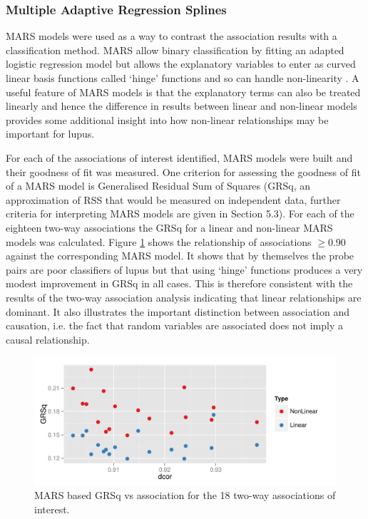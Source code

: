 \documentclass[a4paper, 12pt]{report}
\begin{document}
\subsubsection*{Multiple Adaptive Regression Splines}
MARS models were used as a way to contrast the association results with a classification method. MARS allow binary classification by fitting an adapted logistic regression model but allows the explanatory variables to enter as curved linear basis functions called `hinge' functions and so can handle non-linearity \cite{earth}. A useful feature of MARS models is that the explanatory terms can also be treated linearly and hence the difference in results between linear and non-linear models provides some additional insight into how non-linear relationships may be important for lupus. 

For each of the associations of interest identified, MARS models were built and their goodness of fit was measured. One criterion for assessing the goodness of fit of a MARS model is Generalised Residual Sum of Squares (GRSq, an approximation of RSS that would be measured on independent data, further criteria for interpreting MARS models are given in Section 5.3).  For each of the eighteen two-way associations the GRSq for a linear and non-linear MARS models was calculated. Figure \ref{F:GRSqvAssociation} shows the relationship of associations $\ge 0.90$ against the corresponding MARS model. It shows that by themselves the probe pairs are poor classifiers of lupus but that using `hinge' functions produces a very modest improvement in GRSq in all cases. This is therefore consistent with the results of the two-way association analysis indicating that linear relationships are dominant. It also illustrates the important distinction between association and causation, i.e. the fact that random variables are associated does not imply a causal relationship.

\begin{figure}[H]
\begin{centering}
\includegraphics[width=\textwidth]{grsqVdcor.pdf}
\caption{MARS based GRSq vs association for the 18 two-way associations of interest.} 
\label{F:GRSqvAssociation}
\end{centering}
\end{figure}
\end{document}
